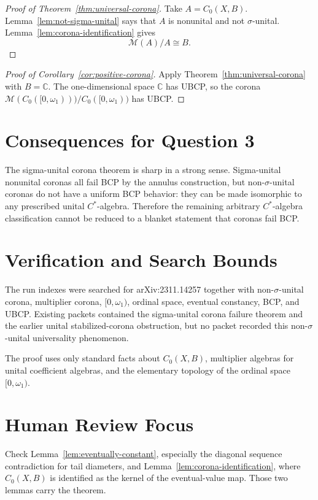 \documentclass[11pt]{article}
\newcommand{\C}{\mathbb C}
\newcommand{\M}{\mathcal M}
\begin{document}
\begin{proof}[Proof of Theorem~\ref{thm:universal-corona}]
Take \(A=C_0(X,B)\).  Lemma~\ref{lem:not-sigma-unital} says that \(A\) is
nonunital and not \(\sigma\)-unital.  Lemma~\ref{lem:corona-identification}
gives
\[
        \M(A)/A\cong B.
\]
\end{proof}

\begin{proof}[Proof of Corollary~\ref{cor:positive-corona}]
Apply Theorem~\ref{thm:universal-corona} with \(B=\C\).  The one-dimensional
space \(\C\) has UBCP, so the corona \(\M(C_0([0,\omega_1)))/C_0([0,\omega_1))\)
has UBCP.
\end{proof}

\section*{Consequences for Question 3}

The sigma-unital corona theorem is sharp in a strong sense.  Sigma-unital
nonunital coronas all fail BCP by the annulus construction, but
non-\(\sigma\)-unital coronas do not have a uniform BCP behavior: they can be
made isomorphic to any prescribed unital \(C^*\)-algebra.  Therefore the
remaining arbitrary \(C^*\)-algebra classification cannot be reduced to a
blanket statement that coronas fail BCP.

\section*{Verification and Search Bounds}

The run indexes were searched for arXiv:2311.14257 together with
non-\(\sigma\)-unital corona, multiplier corona, \([0,\omega_1)\), ordinal
space, eventual constancy, BCP, and UBCP.  Existing packets contained the
sigma-unital corona failure theorem and the earlier unital stabilized-corona
obstruction, but no packet recorded this non-\(\sigma\)-unital universality
phenomenon.

The proof uses only standard facts about \(C_0(X,B)\), multiplier algebras for
unital coefficient algebras, and the elementary topology of the ordinal space
\([0,\omega_1)\).

\section*{Human Review Focus}

Check Lemma~\ref{lem:eventually-constant}, especially the diagonal sequence
contradiction for tail diameters, and Lemma~\ref{lem:corona-identification},
where \(C_0(X,B)\) is identified as the kernel of the eventual-value map.
Those two lemmas carry the theorem.
\end{document}
